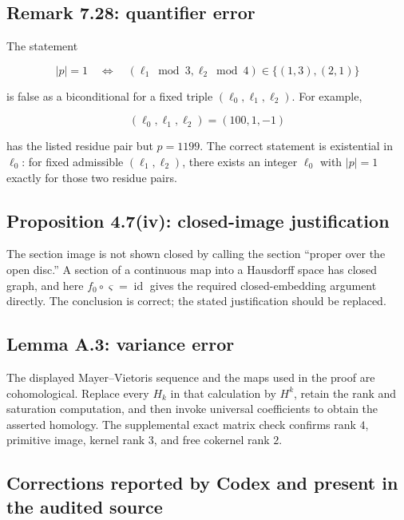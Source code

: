 \documentclass[
  10pt,
  letterpaper,
]{article}
\begin{document}
\subsection{Remark 7.28: quantifier
error}\label{remark-7.28-quantifier-error}

The statement

\[
|p|=1
\quad\Longleftrightarrow\quad
(\ell_1\bmod3,\ell_2\bmod4)\in\{(1,3),(2,1)\}
\]

is false as a biconditional for a fixed triple
\((\ell_0,\ell_1,\ell_2)\). For example,

\[
(\ell_0,\ell_1,\ell_2)=(100,1,-1)
\]

has the listed residue pair but \(p=1199\). The correct statement is
existential in \(\ell_0\): for fixed admissible \((\ell_1,\ell_2)\),
there exists an integer \(\ell_0\) with \(|p|=1\) exactly for those two
residue pairs.

\subsection{Proposition 4.7(iv): closed-image
justification}\label{proposition-4.7iv-closed-image-justification}

The section image is not shown closed by calling the section ``proper
over the open disc.'' A section of a continuous map into a Hausdorff
space has closed graph, and here \(f_0\circ\varsigma=\operatorname{id}\)
gives the required closed-embedding argument directly. The conclusion is
correct; the stated justification should be replaced.

\subsection{Lemma A.3: variance error}\label{lemma-a.3-variance-error}

The displayed Mayer--Vietoris sequence and the maps used in the proof
are cohomological. Replace every \(H_k\) in that calculation by \(H^k\),
retain the rank and saturation computation, and then invoke universal
coefficients to obtain the asserted homology. The supplemental exact
matrix check confirms rank \(4\), primitive image, kernel rank \(3\),
and free cokernel rank \(2\).

\subsection{Corrections reported by Codex and present in the audited
source}\label{corrections-reported-by-codex-and-present-in-the-audited-source}
\end{document}
